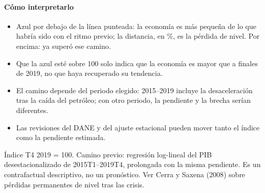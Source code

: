 \paragraph{Cómo interpretarlo}
\begin{itemize}
\item Azul por debajo de la línea punteada: la economía es más pequeña de lo que habría sido con el ritmo previo; la distancia, en \%, es la pérdida de nivel. Por encima: ya superó ese camino.
\item Que la azul esté sobre 100 solo indica que la economía es mayor que a finales de 2019, no que haya recuperado su tendencia.
\item El camino depende del periodo elegido: 2015–2019 incluye la desaceleración tras la caída del petróleo; con otro periodo, la pendiente y la brecha serían diferentes.
\item Las revisiones del DANE y del ajuste estacional pueden mover tanto el índice como la pendiente estimada.
\end{itemize}
\begin{formulas}[Fórmulas]
\end{formulas}
\begin{metodo}[Metodología]
Índice T4 2019 = 100. Camino previo: regresión log-lineal del PIB desestacionalizado de 2015T1–2019T4, prolongada con la misma pendiente. Es un contrafactual descriptivo, no un pronóstico. Ver Cerra y Saxena (2008) sobre pérdidas permanentes de nivel tras las crisis.
\par{}
\end{metodo}


